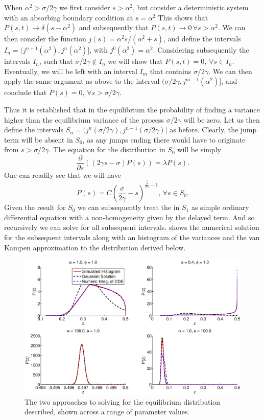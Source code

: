 When $\alpha^2 > \sigma/2\gamma$ we first consider $s>\alpha^2$, but consider a deterministic system with an absorbing boundary condition at $s=\alpha^2$ This shows that $P(s,t) \to \delta(s-\alpha^2)$ and subsequently that $P(s,t) \to 0\, \forall s > \alpha^2$. We can then consider the function $j(s) = \alpha^2s/(\alpha^2+s)$, and define the intervals $I_n = (j^{n+1}(\alpha^2), j^n(\alpha^2)]$, with $j^0(\alpha^2) = \alpha^2$. Considering subsequently the intervals $I_n$, such that $\sigma/2\gamma \notin I_n$ we will show that $P(s,t) = 0, \, \forall s \in I_n$. Eventually, we will be left with an interval $I_m$ that contains $\sigma/2\gamma$. We can then apply the same argument as above to the interval $(\sigma/2\gamma,j^{m-1}(\alpha^2)]$, and conclude that $P(s) = 0,\, \forall s > \sigma/2\gamma$.\par
Thus it is established that in the equilibrium the probability of finding a variance higher than the equilibrium variance of the process $\sigma/2\gamma$ will be zero. Let us then define the intervals $S_n = (j^n(\sigma/2\gamma), j^{n-1}(\sigma/2\gamma)]$ as before. Clearly, the jump term will be absent in $S_0$, as any jumps ending there would have to originate from $s > \sigma/2\gamma$. The equation for the distribution in $S_0$ will be simply
\[
\frac{\partial}{\partial s} \left((2\gamma s - \sigma) P(s) \right) =\lambda P(s).
\]
One can readily see that we will have
\begin{equation}
\label{eq:dist_1d_exact}
P(s)= C \left(\frac{\sigma}{2\gamma} - s\right)^{\frac{\hat{\lambda}}{2\gamma} - 1},\,\forall s \in S_0.
\end{equation}
Given the result for $S_0$ we can subsequently treat the  in $S_1$ as simple ordinary differential equation with a non-homogeneity given by the delayed term. And so recursively we can solve for all subsequent intervals.  shows the numerical solution for the subsequent intervals along with an histogram of the variances and the van Kampen approximation to the distribution derived below.\par
\begin{figure}
\label{fig:comparison_histograms}
\includegraphics[width=\columnwidth]{figures/solution_comparison_OU.eps}
\caption{The two approaches to solving for the equilibrium distribution described, shown across a range of parameter values.}
\end{figure}
